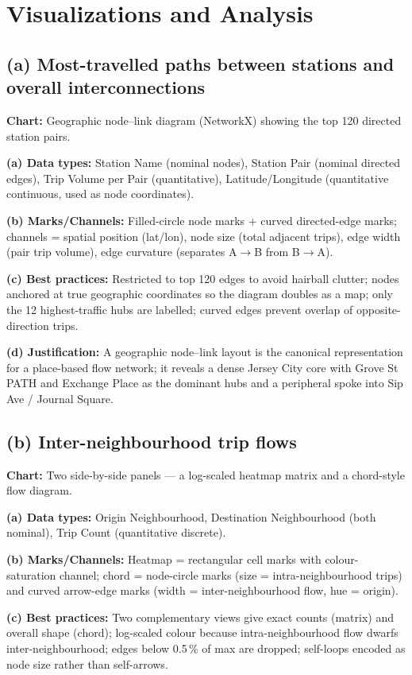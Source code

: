 \documentclass[11pt, a4paper]{article}
\begin{document}
\section{Visualizations and Analysis}

\subsection{(a) Most-travelled paths between stations and overall interconnections}
\textbf{Chart:} Geographic node--link diagram (NetworkX) showing the top 120 directed station pairs.

\textbf{(a) Data types:} Station Name (nominal nodes), Station Pair (nominal directed edges), Trip Volume per Pair (quantitative), Latitude/Longitude (quantitative continuous, used as node coordinates).

\textbf{(b) Marks/Channels:} Filled-circle node marks + curved directed-edge marks; channels = spatial position (lat/lon), node size (total adjacent trips), edge width (pair trip volume), edge curvature (separates A$\to$B from B$\to$A).

\textbf{(c) Best practices:} Restricted to top 120 edges to avoid hairball clutter; nodes anchored at true geographic coordinates so the diagram doubles as a map; only the 12 highest-traffic hubs are labelled; curved edges prevent overlap of opposite-direction trips.

\textbf{(d) Justification:} A geographic node--link layout is the canonical representation for a place-based flow network; it reveals a dense Jersey City core with Grove St PATH and Exchange Place as the dominant hubs and a peripheral spoke into Sip Ave / Journal Square.

\subsection{(b) Inter-neighbourhood trip flows}
\textbf{Chart:} Two side-by-side panels --- a log-scaled heatmap matrix and a chord-style flow diagram.

\textbf{(a) Data types:} Origin Neighbourhood, Destination Neighbourhood (both nominal), Trip Count (quantitative discrete).

\textbf{(b) Marks/Channels:} Heatmap = rectangular cell marks with colour-saturation channel; chord = node-circle marks (size = intra-neighbourhood trips) and curved arrow-edge marks (width = inter-neighbourhood flow, hue = origin).

\textbf{(c) Best practices:} Two complementary views give exact counts (matrix) and overall shape (chord); log-scaled colour because intra-neighbourhood flow dwarfs inter-neighbourhood; edges below 0.5\,\% of max are dropped; self-loops encoded as node size rather than self-arrows.
\end{document}
